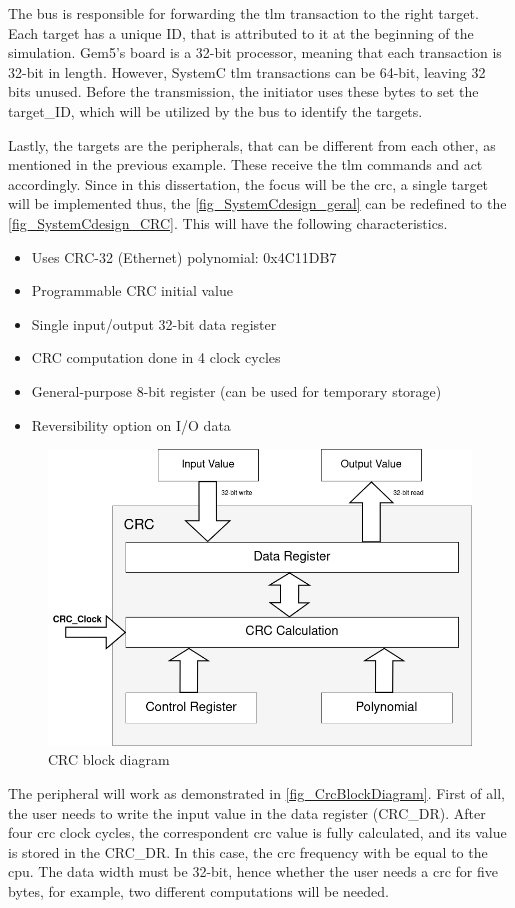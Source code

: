 The bus is responsible for forwarding the \gls{tlm} transaction to the right target. Each target has a unique ID, that is attributed to it 
at the beginning of the simulation. Gem5's board is a 32-bit processor, meaning that each transaction is 32-bit in length. However, SystemC 
\gls{tlm} transactions can be 64-bit, leaving 32 bits unused. Before the transmission, the initiator uses these bytes to set the 
target\_ID, which will be utilized by the bus to identify the targets.

Lastly, the targets are the peripherals, that can be different from each other, as mentioned in the previous example. These receive the 
\gls{tlm} commands and act accordingly. Since in this dissertation, the focus will be the \gls{crc}, a single target will be implemented
thus, the \autoref{fig_SystemCdesign_geral} can be redefined to the \autoref{fig_SystemCdesign_CRC}. This will have the following
characteristics. 

\begin{itemize}
	\item Uses CRC-32 (Ethernet) polynomial: 0x4C11DB7
	\item Programmable CRC initial value
	\item Single input/output 32-bit data register
	\item CRC computation done in 4 clock cycles 
	\item General-purpose 8-bit register (can be used for temporary storage)
	\item Reversibility option on I/O data
\end{itemize}

\begin{figure}[]
	\centering
 	\includegraphics[width=0.6\linewidth]{Images/CrcBlockDiagram.png}
 	\caption{CRC block diagram}
	 \label{fig_CrcBlockDiagram}
\end{figure}

The peripheral will work as demonstrated in \autoref{fig_CrcBlockDiagram}. First of all, the user needs to write the input value 
in the data register (CRC\_DR). After four \gls*{crc} clock cycles, the correspondent \gls*{crc} value is fully calculated, and its
value is stored in the CRC\_DR. In this case, the \gls*{crc} frequency with be equal to the \gls*{cpu}. The data width must be 32-bit, 
hence whether the user needs a \gls*{crc} for five bytes, for example, two different computations will be needed. 

